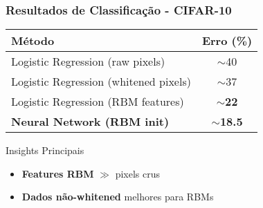 \documentclass[aspectratio=169]{beamer}
\begin{document}
\begin{frame}
\frametitle{Resultados de Classificação - CIFAR-10}
\begin{table}
\centering
\begin{tabular}{lc}
\toprule
\textbf{Método} & \textbf{Erro (\%)} \\
\midrule
Logistic Regression (raw pixels) & $\sim$40 \\
Logistic Regression (whitened pixels) & $\sim$37 \\
Logistic Regression (RBM features) & \textcolor{azulescuro}{\textbf{$\sim$22}} \\
\textbf{Neural Network (RBM init)} & \textcolor{azulescuro}{\textbf{$\sim$18.5}} \\
\bottomrule
\end{tabular}
\end{table}

\begin{alertblock}{Insights Principais}
\begin{itemize}
    \item \textcolor{azulescuro}{\textbf{Features RBM}} $\gg$ pixels crus
    \item \textcolor{azulescuro}{\textbf{Dados não-whitened}} melhores para RBMs
\end{itemize}
\end{alertblock}
\end{frame}
\end{document}
